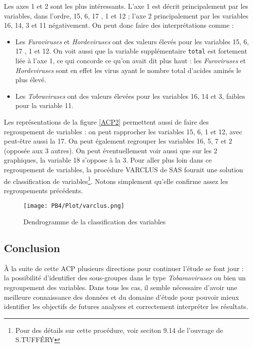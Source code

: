 \documentclass[a4paper]{report}
\begin{document}
Les axes 1 et 2 sont les plus intéressants. L'axe 1 est décrit principalement par les variables, dans l'ordre, 15, 6, 17 , 1 et 12 ; l'axe 2 principalement par les variables 16, 14, 3 et 11 négativement. On peut donc faire des interprétations comme : 
\begin{itemize}
\item Les \emph{Furoviruses} et \emph{Hordeviruses} ont des valeurs élevés pour les variables 15, 6, 17 , 1 et 12. On voit aussi que la variable supplémentaire \verb|total| est fortement liée à l'axe 1, ce qui concorde ce qu'on avait dit plus haut : les \emph{Furoviruses} et \emph{Hordeviruses} sont en effet les virus ayant le nombre total d'acides aminés le plus élevé. 
\item Les \emph{Tobraviruses} ont des valeurs élevées pour les variables 16, 14 et 3, faibles pour la variable 11.
\end{itemize}

Les représentations de la figure \ref{ACP2} permettent aussi de faire des regroupement de variables : on peut rapprocher les variables  15, 6, 1 et 12, avec peut-être aussi la 17. On peut également regrouper les variables 16, 5, 7 et 2 (opposée aux 3 autres). On peut éventuellement voir aussi que sur les 2 graphiques, la variable 18 s'oppose à la 3.
Pour aller plus loin dans ce regroupement de variables, la procédure VARCLUS de SAS fournit une solution de classification de variables\footnote{Pour des détails sur cette procédure, voir seciton 9.14 de l'ouvrage de S.TUFFÉRY}. Notons simplement qu'elle confirme assez les regroupements précédents. 

 \begin{figure}[!ht]
	\centering
     	\texttt{[image: PB4/Plot/varclus.png]}

	\caption{Dendrogramme de la classification des variables}
\end{figure}

\subsection{Conclusion}
À la suite de cette ACP plusieurs directions pour continuer l'étude se font jour : la possibilité d'identifier des sous-groupes dans le type  \emph{Tobamoviruses} ou bien un regroupement des variables. Dans tous les cas, il semble nécessaire d'avoir une meilleure connaissance des données et du domaine d'étude pour pouvoir mieux identifier les objectifs de futures analyses et correctement interpréter les résultats.  
\end{document}
